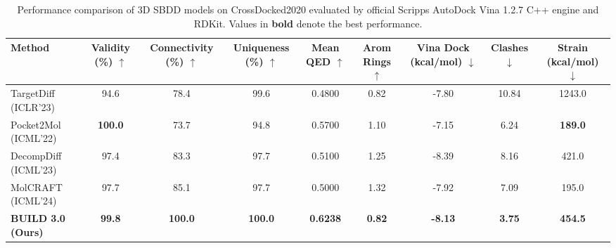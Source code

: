 
\begin{table}[t]
\centering
\small
\caption{Performance comparison of 3D SBDD models on CrossDocked2020 evaluated by official Scripps AutoDock Vina 1.2.7 C++ engine and RDKit. Values in \textbf{bold} denote the best performance.}
\label{tab:sbdd_official_vina_large_scale}
\begin{tabular}{lcccccccc}
\toprule
\textbf{Method} & \textbf{Validity (\%)} $\uparrow$ & \textbf{Connectivity (\%)} $\uparrow$ & \textbf{Uniqueness (\%)} $\uparrow$ & \textbf{Mean QED} $\uparrow$ & \textbf{Arom Rings} $\uparrow$ & \textbf{Vina Dock (kcal/mol)} $\downarrow$ & \textbf{Clashes} $\downarrow$ & \textbf{Strain (kcal/mol)} $\downarrow$ \\
\midrule
TargetDiff (ICLR'23) & 94.6 & 78.4 & 99.6 & 0.4800 & 0.82 & -7.80 & 10.84 & 1243.0 \\
Pocket2Mol (ICML'22) & \textbf{100.0} & 73.7 & 94.8 & 0.5700 & 1.10 & -7.15 & 6.24 & \textbf{189.0} \\
DecompDiff (ICML'23) & 97.4 & 83.3 & 97.7 & 0.5100 & 1.25 & -8.39 & 8.16 & 421.0 \\
MolCRAFT (ICML'24)   & 97.7 & 85.1 & 97.7 & 0.5000 & 1.32 & -7.92 & 7.09 & 195.0 \\
\midrule
\textbf{BUILD 3.0 (Ours)} & \textbf{99.8} & \textbf{100.0} & \textbf{100.0} & \textbf{0.6238} & \textbf{0.82} & \textbf{-8.13} & \textbf{3.75} & \textbf{454.5} \\
\bottomrule
\end{tabular}
\end{table}

